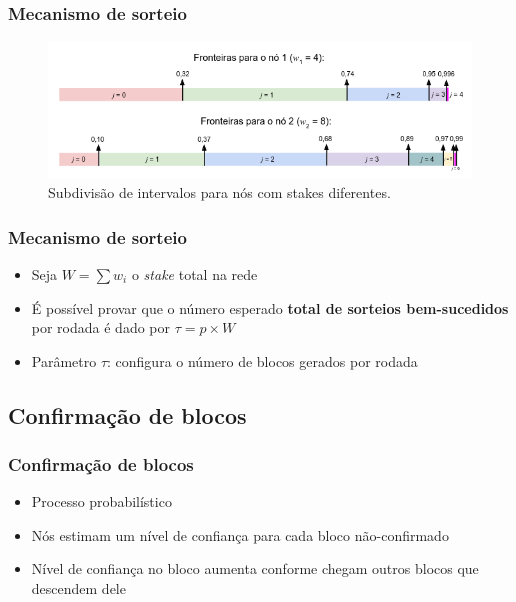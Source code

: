 \documentclass{beamer}
\begin{document}
\begin{frame}
\frametitle{Mecanismo de sorteio}
\begin{figure}
    \centering
    \includegraphics[width=\textwidth]{images/sortition.png}
    \caption{Subdivisão de intervalos para nós com stakes diferentes.}
\end{figure}
\end{frame}

\begin{frame}
\frametitle{Mecanismo de sorteio}
\begin{itemize}
    \item Seja $W = \sum w_i$ o \textit{stake} total na rede
    \item É possível provar que o número esperado \textbf{total de sorteios bem-sucedidos} por rodada é dado por $\tau = p \times W$
    \pause
    \item Parâmetro $\tau$: configura o número de blocos gerados por rodada
\end{itemize}
\end{frame}

\subsection{Confirmação de blocos}
\begin{frame}
\frametitle{Confirmação de blocos}
\begin{itemize}
    \item<1-> Processo probabilístico
    \item<2-> Nós estimam um nível de confiança para cada bloco não-confirmado
    \item<3-> Nível de confiança no bloco aumenta conforme chegam outros blocos
              que descendem dele
\end{itemize}
\end{frame}
\end{document}

